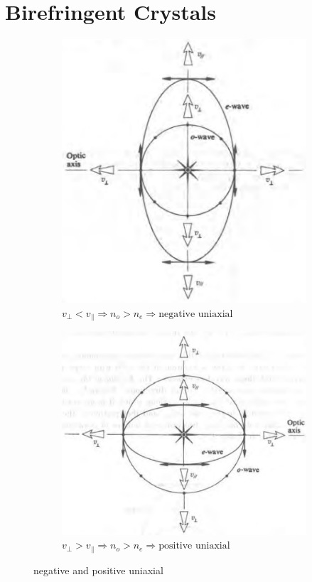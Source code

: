 \section{Birefringent Crystals}

\begin{figure}[H]
  \centering
  \begin{subfigure}{.45\textwidth}
    \centering
    \includegraphics[width=0.7\linewidth]{figures/negative-uniaxial}
    \caption{$v_{\perp} < v_{\parallel} \Rightarrow n_o > n_e \Rightarrow \text{negative uniaxial}$}
  \end{subfigure}
  \begin{subfigure}{.45\textwidth}
    \centering
    \includegraphics[width=0.7\linewidth]{figures/positive-uniaxial}
    \caption{$v_{\perp} > v_{\parallel} \Rightarrow n_o > n_e \Rightarrow \text{positive uniaxial}$}
  \end{subfigure}
  \caption{negative and positive uniaxial}
\end{figure}

